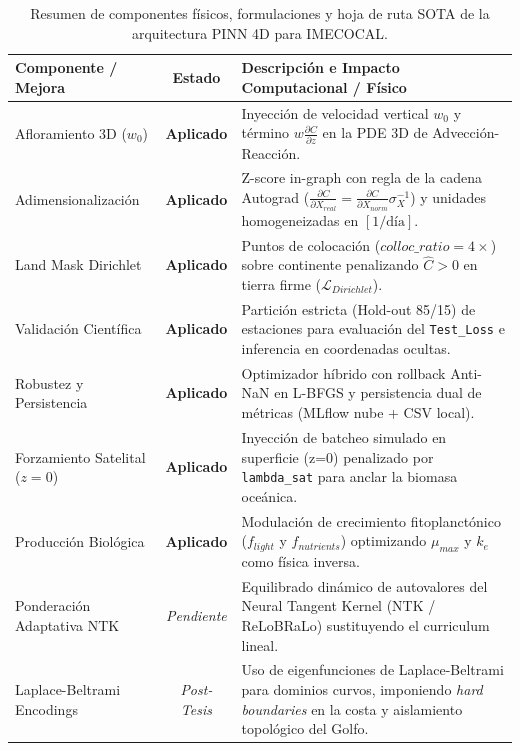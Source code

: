 \documentclass[11pt,a4paper]{article}
\begin{document}
\begin{table}[H]
\centering
\caption{Resumen de componentes físicos, formulaciones y hoja de ruta SOTA de la arquitectura PINN 4D para IMECOCAL.}
\label{tab:pinn_sota_summary}
\vspace{0.2cm}
\small
\begin{tabular}{|l|c|p{8.2cm}|}
\hline
\textbf{Componente / Mejora} & \textbf{Estado} & \textbf{Descripción e Impacto Computacional / Físico} \\ \hline
Afloramiento 3D ($w_0$) & \textbf{Aplicado} & Inyección de velocidad vertical $w_0$ y término $w \frac{\partial C}{\partial z}$ en la PDE 3D de Advección-Reacción. \\ \hline
Adimensionalización & \textbf{Aplicado} & Z-score in-graph con regla de la cadena Autograd ($\frac{\partial C}{\partial X_{real}} = \frac{\partial C}{\partial X_{norm}} \sigma_X^{-1}$) y unidades homogeneizadas en $[1/\text{día}]$. \\ \hline
Land Mask Dirichlet & \textbf{Aplicado} & Puntos de colocación ($colloc\_ratio = 4\times$) sobre continente penalizando $\hat{C} > 0$ en tierra firme ($\mathcal{L}_{Dirichlet}$). \\ \hline
Validación Científica & \textbf{Aplicado} & Partición estricta (Hold-out 85/15) de estaciones para evaluación del \texttt{Test\_Loss} e inferencia en coordenadas ocultas. \\ \hline
Robustez y Persistencia & \textbf{Aplicado} & Optimizador híbrido con rollback Anti-NaN en L-BFGS y persistencia dual de métricas (MLflow nube + CSV local). \\ \hline
Forzamiento Satelital ($z=0$) & \textbf{Aplicado} & Inyección de batcheo simulado en superficie (z=0) penalizado por \texttt{lambda\_sat} para anclar la biomasa oceánica. \\ \hline
Producción Biológica & \textbf{Aplicado} & Modulación de crecimiento fitoplanctónico ($f_{light}$ y $f_{nutrients}$) optimizando $\mu_{max}$ y $k_e$ como física inversa. \\ \hline
Ponderación Adaptativa NTK & \textit{Pendiente} & Equilibrado dinámico de autovalores del Neural Tangent Kernel (NTK / ReLoBRaLo) sustituyendo el curriculum lineal. \\ \hline
Laplace-Beltrami Encodings & \textit{Post-Tesis} & Uso de eigenfunciones de Laplace-Beltrami para dominios curvos, imponiendo \textit{hard boundaries} en la costa y aislamiento topológico del Golfo. \\ \hline
\end{tabular}
\end{table}
\end{document}
